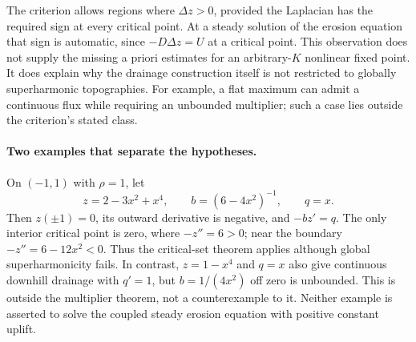 \documentclass[11pt,a4paper]{article}
\theoremstyle{definition}\newtheorem{definition}[theorem]{Definition}
\theoremstyle{remark}\newtheorem{remark}[theorem]{Remark}
\begin{document}
The criterion allows regions where $\Delta z>0$, provided the Laplacian has the required sign at every critical point. At a steady solution of the erosion equation that sign is automatic, since $-D\Delta z=U$ at a critical point. This observation does not supply the missing a priori estimates for an arbitrary-$K$ nonlinear fixed point. It does explain why the drainage construction itself is not restricted to globally superharmonic topographies. For example, a flat maximum can admit a continuous flux while requiring an unbounded multiplier; such a case lies outside the criterion's stated class.


\paragraph{Two examples that separate the hypotheses.}
On $(-1,1)$ with $\rho=1$, let
\[
 z=2-3x^2+x^4,\qquad b=(6-4x^2)^{-1},\qquad q=x.
\]
Then $z(\pm1)=0$, its outward derivative is negative, and $-bz'=q$.
The only interior critical point is zero, where $-z''=6>0$;
near the boundary $-z''=6-12x^2<0$. Thus the critical-set theorem
applies although global superharmonicity fails.
In contrast, $z=1-x^4$ and $q=x$ also give continuous downhill drainage
with $q'=1$, but $b=1/(4x^2)$ off zero is unbounded. This is outside
the multiplier theorem, not a counterexample to it. Neither example
is asserted to solve the coupled steady erosion equation with positive constant uplift.
\end{document}
